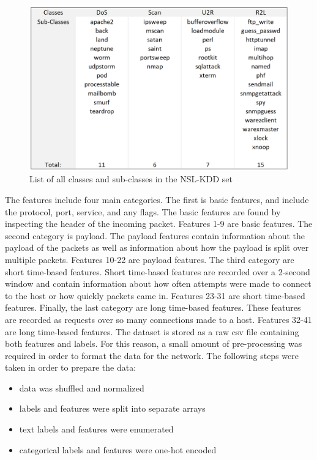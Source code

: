 \documentclass{article}
\begin{document}
\begin{figure}[!htb]
  \centering
  \includegraphics[totalheight=6cm]{figures/class-breakdown.png}
  \caption{List of all classes and sub-classes in the NSL-KDD set}
  \label{fig:class-breakdown}
  \centering
\end{figure}

The features include four main categories. The first is basic features, and include the protocol, port, service, and any flags. The basic features are found by inspecting the header of the incoming packet. Features 1-9 are basic features. The second category is payload. The payload features contain information about the payload of the packets as well as information about how the payload is split over multiple packets. Features 10-22 are payload features. The third category are short time-based features. Short time-based features are recorded over a 2-second window and contain information about how often attempts were made to connect to the host or how quickly packets came in. Features 23-31 are short time-based features. Finally, the last category are long time-based features. These features are recorded as requests over so many connections made to a host. Features 32-41 are long time-based features. The dataset is stored as a raw csv file containing both features and labels. For this reason, a small amount of pre-processing was required in order to format the data for the network. The following steps were taken in order to prepare the data:

\begin{itemize}
  \item data was shuffled and normalized
  \item labels and features were split into separate arrays
  \item text labels and features were enumerated
  \item categorical labels and features were one-hot encoded
\end{itemize}
\end{document}
